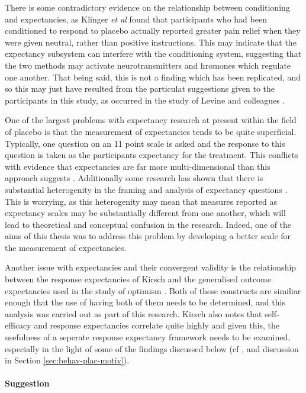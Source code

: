 There is some contradictory evidence on the relationship between conditioning and expectancies, as Klinger \textit{et al} \cite{Klinger2007a} found that participants who had been conditioned to respond to placebo actually reported greater pain relief when they were given neutral, rather than positive instructions. This may indicate that the expectancy subsystem can interfere with the conditioning system, suggesting that the two methods may activate neurotransmitters and hromones which regulate one another. That being said, this is not a finding which has been replicated, and so this may just have resulted from the particulat suggestions given to the participants in this study, as occurred in the study of Levine and colleagues \cite{Levine2006}. 

One of the largest problems with expectancy research at present within the field of placebo is that the measurement of expectancies tends to be quite superficial. Typically, one question on an 11 point scale is asked and the response to this question is taken as the participants expectancy for the treatment. This conflicts with evidence that expectancies are far more multi-dimensional than this approach suggests \cite{myers2008patient}. Additionally some research has shown that there is substantial heterogenity in the framing and analysis of expectancy questions \cite{myers2008patient}. This is worrying, as this heterogenity may mean that measures reported as expectancy scales may be substantially different from one another, which will lead to theoretical and conceptual confusion in the research. Indeed, one of the aims of this thesis was to address this problem by developing a better scale for the measurement of expectancies. 

Another issue with expectancies and their convergent validity is the relationship between the response expectancies of Kirsch  and the generalised outcome expectancies used in the study of optimism \cite{Carver2010}. Both of these constructs are similiar enough that the use of having both of them needs to be determined, and this analysis was carried out as part of this research. Kirsch also notes that self-efficacy \cite{Bandura1977} and response expectancies correlate quite highly \cite{Kirsch1985} and given this, the usefulness of a seperate response expectancy framework needs to be examined, especially in the light of some of the findings discussed below (cf \cite{Geers2005} \cite{Hyland2007}, and discussion in Section \ref{sec:behav-plac-motiv}). 

\paragraph{Suggestion} 
\label{sec:suggestion}

